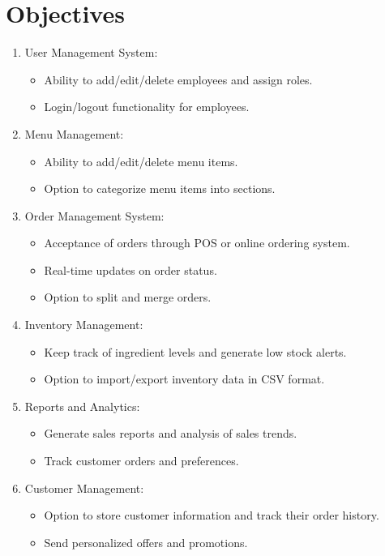 \documentclass{article}
\begin{document}
\section{Objectives}
\begin{enumerate}
	\item User Management System:
		\begin{itemize}
			\item Ability to add/edit/delete employees and assign roles.
			\item Login/logout functionality for employees.
		\end{itemize}
	\item Menu Management:
		\begin{itemize}
			\item Ability to add/edit/delete menu items.
			\item Option to categorize menu items into sections.
		\end{itemize}
	\item Order Management System:
		\begin{itemize}
			\item Acceptance of orders through POS or online ordering system.
			\item Real-time updates on order status.
			\item Option to split and merge orders.
		\end{itemize}
	\item Inventory Management:
		\begin{itemize}
			\item Keep track of ingredient levels and generate low stock alerts.
			\item Option to import/export inventory data in CSV format.
		\end{itemize}
	\item Reports and Analytics:
		\begin{itemize}
			\item Generate sales reports and analysis of sales trends.
			\item Track customer orders and preferences.
		\end{itemize}
	\item Customer Management:
		\begin{itemize}
			\item 	Option to store customer information and track their order history.
			\item 	Send personalized offers and promotions.
		\end{itemize}

\end{enumerate}
\end{document}
